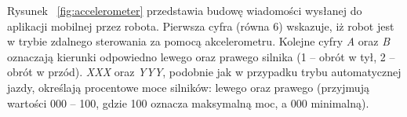 Rysunek ~\ref{fig:accelerometer} przedstawia budowę wiadomości wysłanej do aplikacji mobilnej przez robota. Pierwsza cyfra (równa 6) wskazuje, iż robot jest w trybie zdalnego sterowania za pomocą akcelerometru. Kolejne cyfry \textit{A} oraz \textit{B} oznaczają kierunki odpowiedno lewego oraz prawego silnika (1 – obrót w tył, 2 – obrót w przód). \textit{XXX} oraz \textit{YYY}, podobnie jak w przypadku trybu automatycznej jazdy, określają procentowe moce silników: lewego oraz prawego (przyjmują wartości 000 – 100, gdzie 100 oznacza maksymalną moc, a 000 minimalną).  

